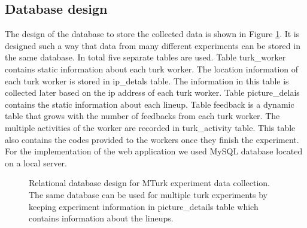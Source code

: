 \documentclass[11pt]{article}
\begin{document}
\subsection{Database design} The design of the database to store the collected data is shown in Figure \ref{fig:turk_database_design}. It is designed such a way that data from many different experiments can be stored in the same database. In total five separate tables are used. Table turk\_worker contains static information about each turk worker. The location information of each turk worker is stored in ip\_detals table. The information in this table is collected later based on the ip address of each turk worker. Table picture\_delais contains the static information about each lineup. Table feedback is a dynamic table that grows with the number of feedbacks from each turk worker. The multiple activities of the worker are recorded in turk\_activity table. This table also contains the codes provided to the workers once they finish the experiment. For the implementation of the web application we used MySQL database located on a local server.

\begin{figure}[hbtp]
   \centering
       \caption{Relational database design for MTurk experiment data collection. The same database can be used for multiple turk experiments by keeping experiment information in picture\_details table which contains information about the lineups.}
       \label{fig:turk_database_design}
\end{figure}
\end{document}
